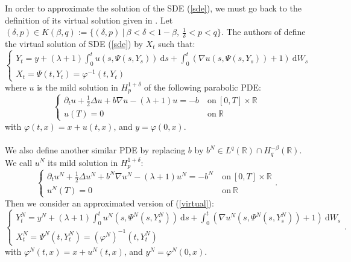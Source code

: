 \documentclass[11pt]{article}
\newcommand{\R}{\mathbb{R}}
\newcommand{\di}{\mathrm{d}}
\begin{document}
In order to approximate the solution of the SDE (\ref{sde}), we must go back to the definition of its virtual solution given in \cite{Fla-Iss-Rus-2017}. Let $(\delta,p)\in K(\beta,q):=\{(\delta,p)\ |\ \beta<\delta<1-\beta,\ \frac{1}{\delta}<p<q\}$. The authors of \cite{Fla-Iss-Rus-2017} define the virtual solution of SDE (\ref{sde}) by $X_t$ such that:
\begin{equation}\label{virtual}
\begin{cases}
Y_t = y + (\lambda+1)\int_0^t u(s,\Psi\left(s,Y_s\right))\ \di s +\int_0^t (\nabla u(s,\Psi\left(s,Y_s\right))+1)\ \di W_s \\X_t = \Psi(t,Y_t) = \varphi^{-1}(t,Y_t)
\end{cases}
\end{equation}
where $u$ is the mild solution in $H_p^{1+\delta}$ of the following parabolic PDE:
\begin{equation}\label{pde}
\begin{cases}
\partial_t u + \frac{1}{2}\Delta u + b\nabla u - (\lambda+1)u = -b\ &\mathrm{on}\ [0,T]\times\R\\
u(T) = 0\ &\mathrm{on}\ \R
\end{cases}
\end{equation}
with $\varphi(t,x) = x + u(t,x)$, and $y=\varphi(0,x)$.

\paragraph{}
We also define another similar PDE by replacing $b$ by $b^N\in L^q(\R)\cap H^{-\beta}_q(\R)$. We call $u^N$ its mild solution in $H_p^{1+\delta}$:
\begin{equation}\label{pde2}
\begin{cases}
\partial_t u^N + \frac{1}{2}\Delta u^N + b^N\nabla u^N - (\lambda+1)u^N = -b^N\ &\mathrm{on}\ [0,T]\times\R\\
u^N(T) = 0\ &\mathrm{on}\ \R
\end{cases}.
\end{equation}
Then we consider an approximated version of (\ref{virtual}): \begin{equation}\label{virtual approx}
\begin{cases}
Y_t^N = y^N + (\lambda+1)\int_0^t u^N\left(s,\Psi^N\left(s,Y_s^N\right)\right)\ \di s +\int_0^t \left(\nabla u^N\left(s,\Psi^N\left(s,Y_s^N\right)\right)+1\right)\ \di W_s\\
X_t^N = \Psi^N(t,Y_t^N) = {(\varphi^N)}^{-1}(t,Y_t^N)
\end{cases}.
\end{equation}
with $\varphi^N(t,x) = x + u^N(t,x)$, and $y^N=\varphi^N(0,x)$.
\end{document}
